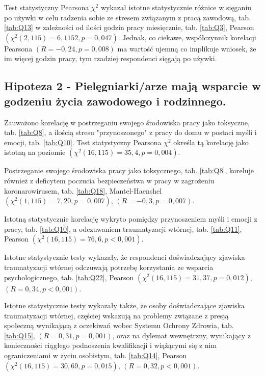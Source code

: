 \documentclass[a4paper,12pt,twoside,openright]{mwrep}
\begin{document}
Test statystyczny Pearsona $\chi^2$ wykazał istotne statystycznie różnice w sięganiu po używki w celu radzenia sobie ze stresem związanym z pracą zawodową, tab. \ref{tab:Q13} w zależności od ilości godzin pracy miesięcznie, tab. \ref{tab:Q3}, Pearson $(\chi^2 (2, 115) = 6,1152, p=0,047)$. Jednak, co ciekawe, współczynnik korelacji Pearsona $(R = -0,24, p = 0,008)$ ma wartość ujemną co implikuje wniosek, że im więcej godzin pracy, tym rzadziej respondenci sięgają po używki.



 

\subsection*{Hipoteza 2 - Pielęgniarki/arze mają wsparcie w godzeniu życia zawodowego i rodzinnego.}



Zauważono korelację w postrzeganiu swojego środowiska pracy jako toksyczne, tab. \ref{tab:Q8}, a ilością stresu "przynoszonego" z pracy do domu w postaci myśli i emocji, tab. \ref{tab:Q10}. Test statystyczny Pearsona $\chi^2$ określa tą korelację jako istotną na poziomie $(\chi^2 (16, 115) = 35,4, p = 0,004)$.

Postrzeganie swojego środowiska pracy jako toksycznego, tab. \ref{tab:Q8}, koreluje również z deficytem poczucia bezpieczeństwa w pracy w zagrożeniu koronarowirusem, tab. \ref{tab:Q18}, Mantel-Haenshel $(\chi^2 (1, 115) = 7,20, p=0,007)$, $(R = -0,3, p = 0,007)$. 

Istotną statystycznie korelację wykryto pomiędzy przynoszeniem myśli i emocji z pracy, tab. \ref{tab:Q10}, a odczuwaniem traumatyzacji wtórnej, tab. \ref{tab:Q11}, Pearson $(\chi^2 (16, 115) = 76,6, p < 0,001)$.
  
Istotne statystycznie testy wykazały, że respondenci doświadczający zjawiska traumatyzacji wtórnej odczuwają potrzebę korzystania ze wsparcia psychologicznego, tab. \ref{tab:Q22}, Pearson $(\chi^2 (16, 115) = 31,37, p = 0,012)$,  $(R = 0,34, p < 0,001)$.

Istotne statystycznie testy wykazały także, że osoby doświadczające zjawiska traumatyzacji wtórnej, częściej wskazują na problemy związane z presją społeczną wynikającą z oczekiwań wobec Systemu Ochrony Zdrowia, tab. \ref{tab:Q15}, $(R = 0,31, p = 0,001)$, oraz na dylemat wewnętrzny, wynikający z konieczności ciągłego podnoszenia kwalifikacji i wiążącymi się z nim ograniczeniami w życiu osobistym, tab. \ref{tab:Q14}, Pearson $(\chi^2 (16, 115) = 30,69, p = 0,015)$,  $(R = 0,32, p < 0,001)$.
\end{document}
